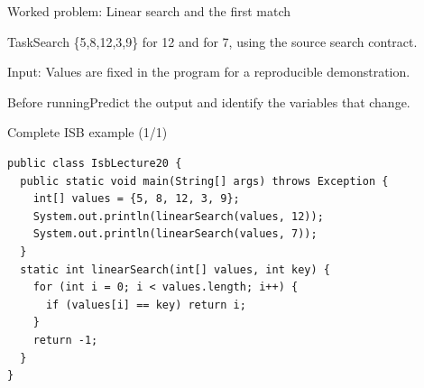 \documentclass[10pt,aspectratio=169]{beamer}
\begin{document}
\begin{frame}[fragile,t]{Worked problem: Linear search and the first match}
\begin{block}{Task}Search \{5,8,12,3,9\} for 12 and for 7, using the source search contract.\end{block}
\small Input: Values are fixed in the program for a reproducible demonstration.\par\vspace{3mm}\begin{exampleblock}{Before running}Predict the output and identify the variables that change.\end{exampleblock}
\end{frame}

\begin{frame}[fragile,t]{Complete ISB example (1/1)}
\begin{lstlisting}
public class IsbLecture20 {
  public static void main(String[] args) throws Exception {
    int[] values = {5, 8, 12, 3, 9};
    System.out.println(linearSearch(values, 12));
    System.out.println(linearSearch(values, 7));
  }
  static int linearSearch(int[] values, int key) {
    for (int i = 0; i < values.length; i++) {
      if (values[i] == key) return i;
    }
    return -1;
  }
}
\end{lstlisting}
\end{frame}
\end{document}

